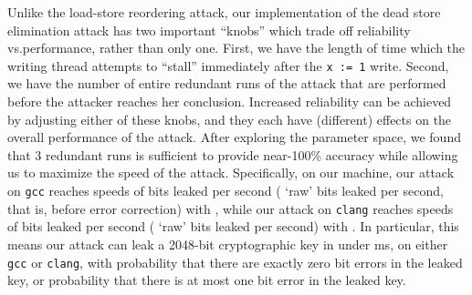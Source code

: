 Unlike the load-store reordering attack, our implementation of the dead store
elimination attack has two important ``knobs'' which trade off reliability
vs.\@ performance, rather than only one.
First, we have the length of time which the writing thread attempts to
``stall'' immediately after the \verb|x := 1| write.
Second, we have the number of entire redundant runs of the attack that are
performed before the attacker reaches her conclusion.
Increased reliability can be achieved by adjusting either of these knobs,
and they each have (different) effects on the overall performance of the
attack.
After exploring the parameter space, we found that $3$ redundant runs is
sufficient to provide near-100\% accuracy while allowing us to maximize the
speed of the attack.
Specifically, on our machine, our attack on \verb|gcc| reaches speeds of
 bits leaked per second
( `raw' bits leaked per second, that is, before
error correction) with , while our attack on
\verb|clang| reaches speeds of  bits leaked per
second ( `raw' bits leaked per second) with
.
In particular, this means our attack can leak a 2048-bit cryptographic key in
under  ms, on either \verb|gcc| or \verb|clang|, with
probability  that there are exactly zero bit errors in
the leaked key, or probability  that there is at most
one bit error in the leaked key.
